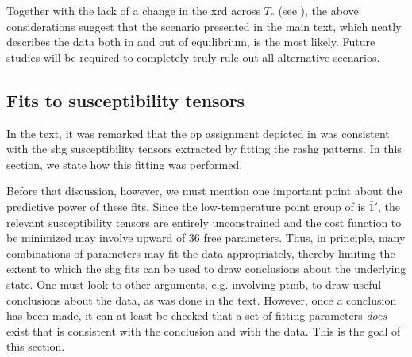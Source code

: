 Together with the lack of a change in the \gls{xrd} across $T_c$ (see ), the above considerations suggest that the scenario presented in the main text, which neatly describes the data both in and out of equilibrium, is the most likely.
Future studies will be required to completely truly rule out all alternative scenarios.

\subsection{Fits to susceptibility tensors}\label{sec:fitting}

In the text, it was remarked that the \gls{op} assignment depicted in  was consistent with the \gls{shg} susceptibility tensors extracted by fitting the \gls{rashg} patterns.
In this section, we state how this fitting was performed.

Before that discussion, however, we must mention one important point about the predictive power of these fits.
Since the low-temperature point group of \cmb is $\bar{1}'$, the relevant susceptibility tensors are entirely unconstrained and the cost function to be minimized may involve upward of 36 free parameters.
Thus, in principle, many combinations of parameters may fit the data appropriately, thereby limiting the extent to which the \gls{shg} fits can be used to draw conclusions about the underlying state.
One must look to other arguments, e.g. involving \gls{ptmb}, to draw useful conclusions about the data, as was done in the text.
However, once a conclusion has been made, it can at least be checked that a set of fitting parameters \textit{does} exist that is consistent with the conclusion and with the data.
This is the goal of this section.

